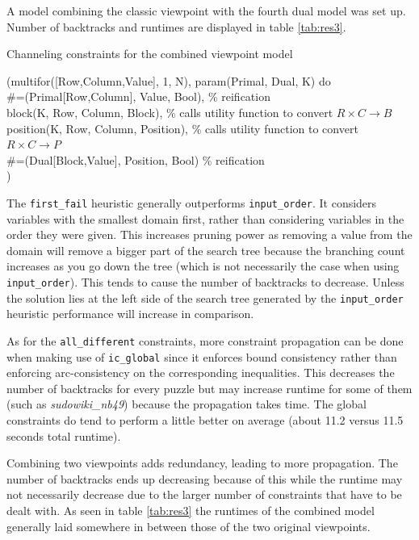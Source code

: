 A model combining the classic viewpoint with the fourth dual model was set up. Number of backtracks and runtimes are displayed in table \ref{tab:res3}.

\begin{snippet}[]
\caption{Channeling constraints for the combined viewpoint model}\label{channeling}
\small
(multifor([Row,Column,Value], 1, N), param(Primal, Dual, K) do \\
    \qquad\#=(Primal[Row,Column], Value, Bool), \% reification \\
    \qquad block(K, Row, Column, Block), \% calls utility function to convert $R\times C\rightarrow B$ \\
    \qquad position(K, Row, Column, Position), \% calls utility function to convert $R\times C\rightarrow P$ \\
    \qquad\#=(Dual[Block,Value], Position, Bool) \% reification\\
)
\end{snippet}

The \texttt{first\_fail} heuristic generally outperforms \texttt{input\_order}. It considers variables with the smallest domain first, rather than considering variables in the order they were given. This increases pruning power as removing a value from the domain will remove a bigger part of the search tree because the branching count increases as you go down the tree (which is not necessarily the case when using \texttt{input\_order}). This tends to cause the number of backtracks to decrease. Unless the solution lies at the left side of the search tree generated by the \texttt{input\_order} heuristic performance will increase in comparison. \\\par

As for the \texttt{all\_different} constraints, more constraint propagation can be done when making use of \texttt{ic\_global} since it enforces bound consistency \cite{article:puget} rather than enforcing arc-consistency on the corresponding inequalities. This decreases the number of backtracks for every puzzle but may increase runtime for some of them (such as \textit{sudowiki\_nb49}) because the propagation takes time. The global constraints do tend to perform a little better on average (about 11.2 versus 11.5 seconds total runtime).\\\par

Combining two viewpoints adds redundancy, leading to more propagation. The number of backtracks ends up decreasing because of this while the runtime may not necessarily decrease due to the larger number of constraints that have to be dealt with. As seen in table \ref{tab:res3} the runtimes of the combined model generally laid somewhere in between those of the two original viewpoints.

